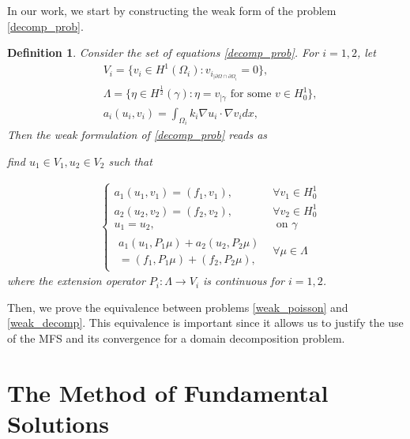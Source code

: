 \documentclass[5p,authoryear]{elsarticle}
\newtheorem{definition}[theorem]{Definition}
\begin{document}
In our work, we start by constructing the weak form of the problem \eqref{decomp_prob}.
\begin{definition}
    Consider the set of equations \eqref{decomp_prob}. For \(i=1, 2\), let
    \begin{align*}
        &V_i = \{v_i \in H^1(\Omega_i): v_{i_{|\partial \Omega \cap \partial {\Omega_i}}}=0\},\\
        &\Lambda = \{\eta \in H^\frac{1}{2}(\gamma): \eta = v_{|\gamma} \text{ for some } v \in H^1_0\}, \\
        &a_i (u_i, v_i) = \int_{\Omega_i} k_i\nabla u_i \cdot \nabla v_i dx,
    \end{align*}
    Then the weak formulation of \eqref{decomp_prob} reads as
    \begin{center}
        \textit{find} \(u_1\in V_1, u_2 \in V_2\) \textit{such that}
    \end{center}
    \begin{equation}\label{weak_decomp}
        \begin{aligned}
            &\begin{cases}
                a_1(u_1, v_1) = (f_1, v_1), & \forall v_1 \in H^1_0\\
                a_2(u_2, v_2) = (f_2, v_2), & \forall v_2 \in H^1_0\\
                u_1 = u_2, & \text{ on } \gamma\\
                \begin{aligned}
                a_1(u_1, P_1 \mu) + a_2(u_2, P_2 \mu) \\[0.2cm] = (f_1, P_1 \mu)
                + (f_2, P_2 \mu),
                \end{aligned} & \forall \mu \in \Lambda
            \end{cases}
        \end{aligned}
        \end{equation}
    where the extension operator \(P_i: \Lambda \rightarrow V_i\) is continuous for \(i=1, 2\).
\end{definition}

Then, we prove the equivalence between problems \eqref{weak_poisson} and \eqref{weak_decomp}. This equivalence is important since it allows us to justify the use of the MFS and its convergence for a domain decomposition problem.

\section{The Method of Fundamental Solutions}
\end{document}
